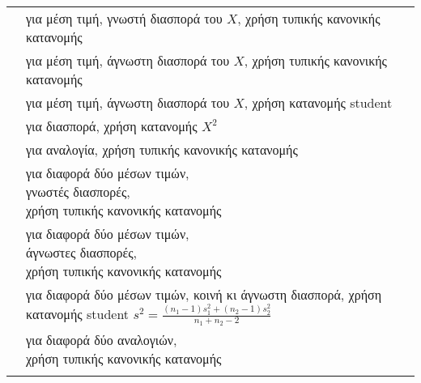 \documentclass[12pt]{article}
\begin{document}
\begin{tabular}{|l|l|}
\hl
     $\bar{x} \pm z_{1-a/2}σ/ \sqrt{n}$ & \makecell[l]{\\[-0.2cm]για μέση τιμή, γνωστή διασπορά του $X$,\\χρήση τυπικής κανονικής κατανομής } \\
\hl

     $\bar{x} \pm z_{1-a/2}s/ \sqrt{n}$ & \makecell[l]{\\[-0.2cm]για μέση τιμή, άγνωστη διασπορά του $X$,\\χρήση τυπικής κανονικής κατανομής } \\
\hl
     
     $\bar{x} \pm t_{1-a/2,n-1}s/ \sqrt{n}$ & \makecell[l]{\\[-0.2cm]για μέση τιμή, άγνωστη διασπορά του $X$,\\χρήση κατανομής student} \\
\hl

    $\left[ \frac{(n-1)s^2}{x_{n-1,1-a/2}^2}, \  \frac{(n-1)s^2}{x_{n-1,a/2}^2} \right]$ & για διασπορά, χρήση κατανομής $X^2$ \\
\hl

    $\hat{p} \pm z_{1-a/2} \sqrt{\frac{\hat{p}(1-\hat{p})}{n}}$ & για αναλογία, χρήση τυπικής κανονικής κατανομής \\
\hl

    $(\bar{x}_1-\bar{x}_2) \pm z_{1-a/2}\sqrt{\frac{σ_1^2}{n_1}+\frac{σ_2^2}{n_2}}$ & \makecell[l]{για διαφορά δύο μέσων τιμών,\\γνωστές διασπορές,\\χρήση τυπικής κανονικής κατανομής}\\
\hl

    $(\bar{x}_1-\bar{x}_2) \pm z_{1-a/2}\sqrt{\frac{s_1^2}{n_1}+\frac{s_2^2}{n_2}}$ & \makecell[l]{για διαφορά δύο μέσων τιμών,\\άγνωστες διασπορές,\\χρήση τυπικής κανονικής κατανομής}\\
\hl

    $(\bar{x}_1-\bar{x}_2) \pm t_{n_1+n_2-2,1-a/2}\ s\sqrt{\frac{1}{n_1} + \frac{1}{n_2}}$ & \makecell[l]{για διαφορά δύο μέσων τιμών, κοινή κι άγνωστη\\διασπορά, χρήση κατανομής student\\$s^2=\frac{(n_1-1)s_1^2+(n_2-1)s_2^2}{n_1+n_2-2}$}\\
\hl

    $(\hat{p}_1-\hat{p}_2)\pm z_{a/2} \sqrt{\frac{\hat{p}_1 (1-\hat{p}_1)}{n_1} + \frac{\hat{p}_2 (1-\hat{p}_2)}{n_2}}$ & \makecell[l]{για διαφορά δύο αναλογιών,\\χρήση τυπικής κανονικής κατανομής} \\
\hl   
\end{tabular}\\
\end{document}

